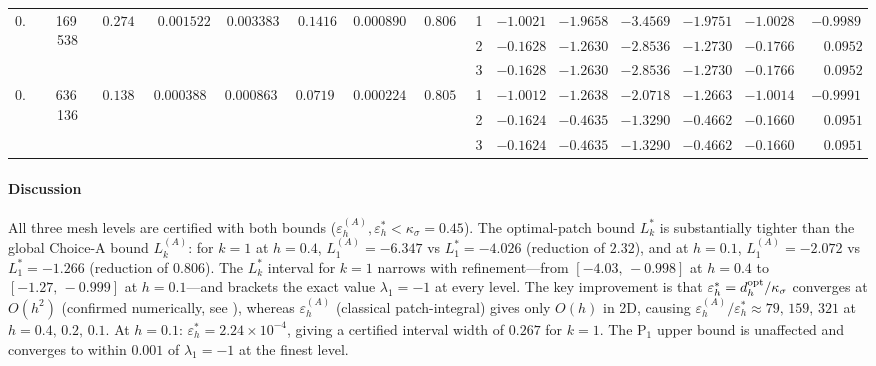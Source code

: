 \documentclass[11pt]{article}
\theoremstyle{plain}
\theoremstyle{definition}
\theoremstyle{remark}
\begin{document}
\begin{table}[htbp]
{\begin{tabular}{ccrrccccc|rrrrrr}
\midrule
\multirow{3}{*}{$0.2$}
  & \multirow{3}{*}{169\,538}
  & \multirow{3}{*}{$0.2745$}
  & \multirow{3}{*}{$0.001522$}
  & \multirow{3}{*}{$0.003383$}
  & \multirow{3}{*}{$0.1416$}
  & \multirow{3}{*}{$0.0008908$}
  & \multirow{3}{*}{$0.8067$}
  & 1 & $-1.0021$ & $-1.9658$ & $-3.4569$ & $-1.9751$ & $-1.0028$ & $-0.9989$ \\
& & & & & & & & 2 & $-0.1628$ & $-1.2630$ & $-2.8536$ & $-1.2730$ & $-0.1766$ & $\phantom{-}0.0952$ \\
& & & & & & & & 3 & $-0.1628$ & $-1.2630$ & $-2.8536$ & $-1.2730$ & $-0.1766$ & $\phantom{-}0.0952$ \\
\midrule
\multirow{3}{*}{$0.1$}
  & \multirow{3}{*}{636\,136}
  & \multirow{3}{*}{$0.1389$}
  & \multirow{3}{*}{$0.0003888$}
  & \multirow{3}{*}{$0.0008639$}
  & \multirow{3}{*}{$0.07191$}
  & \multirow{3}{*}{$0.0002244$}
  & \multirow{3}{*}{$0.8054$}
  & 1 & $-1.0012$ & $-1.2638$ & $-2.0718$ & $-1.2663$ & $-1.0014$ & $-0.9991$ \\
& & & & & & & & 2 & $-0.1624$ & $-0.4635$ & $-1.3290$ & $-0.4662$ & $-0.1660$ & $\phantom{-}0.0951$ \\
& & & & & & & & 3 & $-0.1624$ & $-0.4635$ & $-1.3290$ & $-0.4662$ & $-0.1660$ & $\phantom{-}0.0951$ \\
\bottomrule
\end{tabular}}
\end{table}

\paragraph{Discussion}
All three mesh levels are certified with both bounds ($\varepsilon_h^{(A)},\varepsilon_h^*<\kappa_\sigma=0.45$).
The optimal-patch bound $L_k^*$ is substantially tighter than the global Choice-A bound $L_k^{(A)}$:
for $k=1$ at $h=0.4$, $L_1^{(A)}=-6.347$ vs $L_1^*=-4.026$ (reduction of $2.32$),
and at $h=0.1$, $L_1^{(A)}=-2.072$ vs $L_1^*=-1.266$ (reduction of $0.806$).
The $L_k^*$ interval for $k=1$ narrows with refinement---from
$[-4.03,\,-0.998]$ at $h=0.4$ to $[-1.27,\,-0.999]$ at $h=0.1$---and brackets
the exact value $\lambda_1=-1$ at every level.
The key improvement is that $\varepsilon_h^*=d_h^{\rm opt}/\kappa_\sigma$
converges at $O(h^2)$ (confirmed numerically, see ),
whereas $\varepsilon_h^{(A)}$ (classical patch-integral) gives only $O(h)$ in 2D,
causing $\varepsilon_h^{(A)}/\varepsilon_h^*\approx79,\,159,\,321$ at $h=0.4,\,0.2,\,0.1$.
At $h=0.1$: $\varepsilon_h^*=2.24\times10^{-4}$, giving a certified interval width of $0.267$
for $k=1$.
The $\mathrm{P}_1$ upper bound is unaffected and converges to within $0.001$ of
$\lambda_1=-1$ at the finest level.
\end{document}
